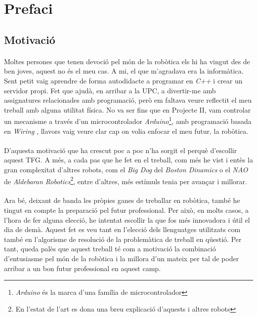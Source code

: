 \documentclass[12pt,a4paper,final,twoside]{article}
\begin{document}
\tableofcontents
\newpage
\listoffigures
\newpage
\listoftables
\newpage



\label{Prefaci}
\section*{Prefaci}

\label{Motivacio}
\subsection*{Motivació}

\paragraph{}Moltes persones que tenen devoció pel món de la robòtica els hi ha vingut des de ben joves, aquest no és el meu cas. A mi, el que m'agradava era la informàtica. Sent petit vaig aprendre de forma autodidacte a programar en \textit{C++} i crear un servidor propi. Fet que ajudà, en arribar a la UPC, a divertir-me amb assignatures relacionades amb programació, però em faltava veure reflectit el meu treball amb alguna utilitat física. No va ser fins que en Projecte II, vam controlar un mecanisme a través d'un microcontrolador \textit{Arduino}\footnote{\textit{Arduino} és la marca d'una família de microcontrolador}, amb programació basada en \textit{Wiring} \cite{Arduino}, llavors vaig veure clar cap on volia enfocar el meu futur, la robòtica.

\paragraph{}D'aquesta motivació que ha crescut poc a poc n'ha sorgit el perquè d'escollir aquest TFG. A més, a cada pas que he fet en el treball, com més he vist i entès la gran complexitat d'altres robots, com el \textit{Big Dog} del \textit{Boston Dinamics} o el \textit{NAO} de \textit{Aldebaran Robotics}\footnote{En l'estat de l'art es dona una breu explicació d'aquests i altres robots}, entre d'altres, més estímuls tenia per avançar i millorar.

\paragraph{}Ara bé, deixant de banda les pròpies ganes de treballar en robòtica, també he tingut en compte la preparació pel futur professional. Per això, en molts casos, a l'hora de fer alguna elecció, he intentat escollir la que fos més innovadora i útil el dia de demà. Aquest fet es veu tant en l'elecció dels llenguatges utilitzats com també en l'algorisme de resolució de la problemàtica de treball en qüestió. Per tant, queda palès que aquest treball té com a motivació la combinació d'entusiasme pel món de la robòtica i la millora d'un mateix per tal de poder arribar a un bon futur professional en aquest camp.
\end{document}
